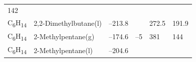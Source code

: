 \documentclass[
  9pt,
]{extbook}
\theoremstyle{definition}
\theoremstyle{definition}
\theoremstyle{definition}
\theoremstyle{remark}
\begin{document}
\begin{longtable}[]{@{}llllll@{}}
\begin{minipage}[t]{0.14\columnwidth}
142\strut
\end{minipage}\tabularnewline
\begin{minipage}[t]{0.07\columnwidth}\raggedright
C\textsubscript{6}H\textsubscript{14}\strut
\end{minipage} & \begin{minipage}[t]{0.17\columnwidth}\raggedright
2,2-Dimethylbutane(l)\strut
\end{minipage} & \begin{minipage}[t]{0.15\columnwidth}\raggedright
--213.8\strut
\end{minipage} & \begin{minipage}[t]{0.15\columnwidth}\raggedright
\strut
\end{minipage} & \begin{minipage}[t]{0.14\columnwidth}\raggedright
272.5\strut
\end{minipage} & \begin{minipage}[t]{0.14\columnwidth}\raggedright
191.9\strut
\end{minipage}\tabularnewline
\begin{minipage}[t]{0.07\columnwidth}\raggedright
C\textsubscript{6}H\textsubscript{14}\strut
\end{minipage} & \begin{minipage}[t]{0.17\columnwidth}\raggedright
2-Methylpentane(g)\strut
\end{minipage} & \begin{minipage}[t]{0.15\columnwidth}\raggedright
--174.6\strut
\end{minipage} & \begin{minipage}[t]{0.15\columnwidth}\raggedright
--5\strut
\end{minipage} & \begin{minipage}[t]{0.14\columnwidth}\raggedright
381\strut
\end{minipage} & \begin{minipage}[t]{0.14\columnwidth}\raggedright
144\strut
\end{minipage}\tabularnewline
\begin{minipage}[t]{0.07\columnwidth}\raggedright
C\textsubscript{6}H\textsubscript{14}\strut
\end{minipage} & \begin{minipage}[t]{0.17\columnwidth}\raggedright
2-Methylpentane(l)\strut
\end{minipage} & \begin{minipage}[t]{0.15\columnwidth}\raggedright
--204.6\strut
\end{minipage} & \begin{minipage}[t]{0.15\columnwidth}\raggedright

\end{minipage}
\end{longtable}
\end{document}
